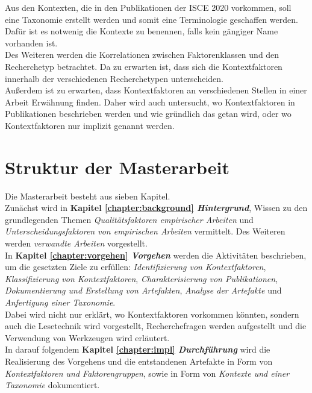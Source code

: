 Aus den Kontexten, die in den Publikationen der ISCE 2020 vorkommen, soll eine Taxonomie erstellt werden und somit eine Terminologie geschaffen werden. Dafür ist es notwenig die Kontexte zu benennen, falls kein gängiger Name vorhanden ist. \\

Des Weiteren werden die Korrelationen zwischen Faktorenklassen und den Recherchetyp betrachtet. Da zu erwarten ist, dass sich die Kontextfaktoren innerhalb der verschiedenen Recherchetypen unterscheiden. \\
Außerdem ist zu erwarten, dass Kontextfaktoren an verschiedenen Stellen in einer Arbeit Erwähnung finden. Daher wird auch untersucht, wo Kontextfaktoren in Publikationen beschrieben werden und wie gründlich das getan wird, oder wo Kontextfaktoren nur implizit genannt werden. \\



\section{Struktur der Masterarbeit}
Die Masterarbeit besteht aus sieben Kapitel. \\

Zunächst wird in \textbf{Kapitel \ref{chapter:background} \textit{Hintergrund}}, Wissen zu den grundlegenden Themen \textit{Qualitätsfaktoren empirischer Arbeiten} und \textit{Unterscheidungsfaktoren von empirischen Arbeiten} vermittelt. Des Weiteren werden \textit{verwandte Arbeiten} vorgestellt. \\

In \textbf{Kapitel \ref{chapter:vorgehen} \textit{Vorgehen}} werden die Aktivitäten beschrieben, um die gesetzten Ziele zu erfüllen: \textit{Identifizierung von Kontextfaktoren}, \textit{Klassifizierung von Kontextfaktoren}, \textit{Charakterisierung von Publikationen}, \textit{Dokumentierung und Erstellung von Artefakten}, \textit{Analyse der Artefakte} und \textit{Anfertigung einer Taxonomie}. \\
Dabei wird nicht nur erklärt, wo Kontextfaktoren vorkommen könnten, sondern auch die Lesetechnik wird vorgestellt, Recherchefragen werden aufgestellt und die Verwendung von Werkzeugen wird erläutert. \\

In darauf folgendem \textbf{Kapitel \ref{chapter:impl} \textit{Durchführung}} wird die Realisierung des Vorgehens und die entstandenen Artefakte in Form von \textit{Kontextfaktoren und Faktorengruppen}, sowie in Form von \textit{Kontexte und einer Taxonomie} dokumentiert. \\


